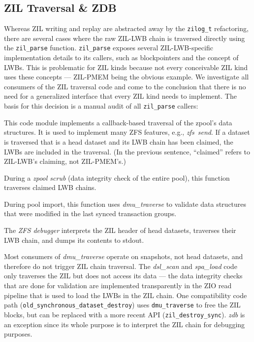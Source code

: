 \documentclass[12pt,a4paper,twoside]{book}
\begin{document}
{\subsection{ZIL Traversal \& ZDB}\label{sec:zil_kinds:traversal}
Whereas ZIL writing and replay are abstracted away by the \lstinline{zilog_t} refactoring, there are several cases where the raw ZIL-LWB chain is traversed directly using the \lstinline{zil_parse} function.
\lstinline{zil_parse} exposes several ZIL-LWB-specific implementation details to its callers, such as blockpointers and the concept of LWBs.
This is problematic for ZIL kinds because not every conceivable ZIL kind uses these concepts --- ZIL-PMEM being the obvious example.
We investigate all consumers of the ZIL traversal code and come to the conclusion that there is no need for a generalized interface that every ZIL kind needs to implement.
The basis for this decision is a manual audit of all \lstinline{zil_parse} callers:
\begin{description}[noitemsep]
    \item[dmu\_traverse] This code module implements a callback-based traversal of the zpool's data structures.
    It is used to implement many ZFS features, e.g., \mbox{\textit{zfs send}}.
    If a dataset is traversed that is a head dataset and its LWB chain has been claimed, the LWBs are included in the traversal.
    (In the previous sentence, ``claimed'' refers to ZIL-LWB's claiming, not ZIL-PMEM's.)
    \item[dsl\_scan\_zil] During a \textit{zpool scrub} (data integrity check of the entire pool), this function traverses claimed LWB chains.
    \item[spa\_load\_verify] During pool import, this function uses \textit{dmu\_traverse} to validate data structures that were modified in the last synced transaction groups.
    \item[zdb\_il.c] The \textit{ZFS debugger} interprets the ZIL header of head datasets, traverses their LWB chain, and dumps its contents to stdout.
\end{description}
Most consumers of \textit{dmu\_traverse} operate on snapshots, not head datasets, and therefore do not trigger ZIL chain traversal.
The \textit{dsl\_scan} and \textit{spa\_load} code only traverses the ZIL but does not access its data --- the data integrity checks that are done for validation are implemented transparently in the ZIO read pipeline that is used to load the LWBs in the ZIL chain.
One compatibility code path (\lstinline{old_synchronous_dataset_destroy}) uses \lstinline{dmu_traverse} to free the ZIL blocks, but can be replaced with a more recent API (\lstinline{zil_destroy_sync}).
\textit{zdb} is an exception since its whole purpose is to interpret the ZIL chain for debugging purposes.

}
\end{document}
